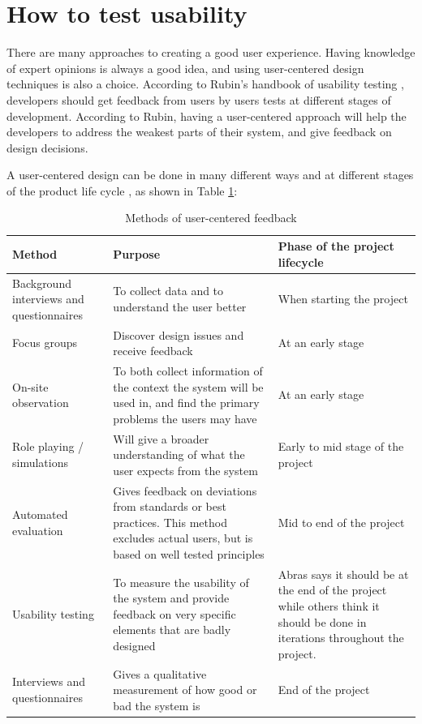 \section{How to test usability}
\label{sec:howtotestusability}
There are many approaches to creating a good user experience. Having knowledge of expert opinions is always a good idea, and using user-centered design techniques is also a choice. According to Rubin's handbook of usability testing \cite{rubin2008handbook}, developers should get feedback from users by users tests at different stages of development. According to Rubin, having a user-centered approach will help the developers to address the weakest parts of their system, and give feedback on design decisions. 

A user-centered design can be done in many different ways and at different stages of the product life cycle \cite{abrasusercentereddesign}, as shown in Table \ref{table:designduringlifecycle}:

\begin{table}[H]
\begin{tabular}{|p{5cm} | p{5cm} | p{5cm} |}
\hline
\textbf{Method} & \textbf{Purpose} & \textbf{Phase of the project lifecycle} \\ \hline
Background interviews and questionnaires & To collect data and to understand the user better & When starting the project \\ \hline
Focus groups & Discover design issues and receive feedback & At an early stage \\ \hline
On-site observation & To both collect information of the context the system will be used in, and find the primary problems the users may have & At an early stage \\ \hline
Role playing / simulations & Will give a broader understanding of what the user expects from the system & Early to mid stage of the project \\ \hline
Automated evaluation & Gives feedback on deviations from standards or best practices. This method excludes actual users, but is based on well tested principles & Mid to end of the project \\ \hline
Usability testing & To measure the usability of the system and provide feedback on very specific elements that are badly designed & Abras \cite{abrasusercentereddesign} says it should be at the end of the project while others \cite{schneidermanusercentered} think it should be done in iterations throughout the project. \\ \hline
Interviews and questionnaires & Gives a qualitative measurement of how good or bad the system is & End of the project \\ \hline
\end{tabular}
\caption{Methods of user-centered feedback}
\label{table:designduringlifecycle}
\end{table}


